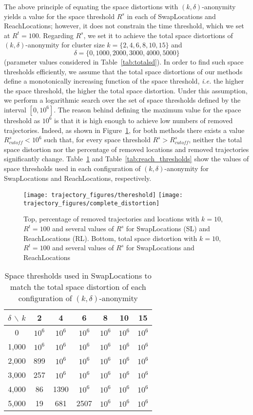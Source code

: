 The above principle of equating the space distortions
with $(k,\delta)$-anonymity yields a value for the space threshold
$R^s$ in each of SwapLocations and ReachLocations; however,
it does not constrain the time threshold, which we set at $R^t=100$.
Regarding $R^s$, we set it to achieve the total space
distortions of $(k,\delta)$-anonymity
for cluster size $k = \{2, 4, 6, 8, 10, 15\}$ and
\[ \delta = \{0, 1000, 2000, 3000, 4000, 5000\} \]
(parameter values considered in Table~\ref{tab:totalsd}).
In order to find such space thresholds efficiently, we assume that
the total space distortions of our methods define a monotonically
increasing function of the space threshold, {\em i.e.} the higher
the space threshold, the higher the total space distortion.
Under this assumption, we perform a logarithmic search over the set
of space thresholds defined by the interval $[0, 10^6]$. The reason behind
defining the maximum value for the space threshold as $10^6$ is
that it is high enough to achieve low numbers of removed trajectories.
Indeed, as shown in Figure~\ref{fig:both_method}, for both methods there
exists a value $R^s_{cutoff} < 10^6$ such
that, for every space threshold $R^s > R^s_{cutoff}$, neither the total
space distortion nor the percentage of removed locations and
removed trajectories significantly change. Table~\ref{tab:swap_thresholds}
and Table~\ref{tab:reach_thresholds} show the values of space thresholds
used in each configuration of $(k,\delta)$-anonymity for
SwapLocations and ReachLocations, respectively.


\begin{figure}[!ht]
\centering
\texttt{[image: trajectory\_figures/thereshold]}
\texttt{[image: trajectory\_figures/complete\_distortion]}
\caption{Top, percentage of removed trajectories and locations
with $k=10$, $R^t=100$ and several
values of $R^s$ for SwapLocations (SL) and ReachLocations (RL). Bottom, total
  space distortion with $k=10$, $R^t = 100$ and several
  values of $R^s$ for SwapLocations and ReachLocations}
  \label{fig:both_method}
\end{figure}

\begin{table}[!ht]
\centering
\begin{tabular}{|c|c|c|c|c|c|c|}
\hline
$\delta$ $\backslash$ $k$ & 2 & 4 & 6 & 8 & 10 & 15 \\
\hline
0 & $10^6$ & $10^6$ & $10^6$ & $10^6$ & $10^6$ & $10^6$ \\
1,000 & $10^6$ & $10^6$ & $10^6$ & $10^6$ & $10^6$ & $10^6$ \\
2,000 & 899 & $10^6$ & $10^6$ & $10^6$ & $10^6$ & $10^6$ \\
3,000 & 257 & $10^6$ & $10^6$ & $10^6$ & $10^6$ & $10^6$ \\
4,000 & 86 & 1390 & $10^6$ & $10^6$ & $10^6$ & $10^6$ \\
5,000 & 19 & 681 & 2507 & $10^6$ & $10^6$ & $10^6$ \\
\hline
\end{tabular}
\caption{Space thresholds used in SwapLocations to match the total
space distortion of each
configuration of $(k, \delta)$-anonymity}
\label{tab:swap_thresholds}
\end{table}


